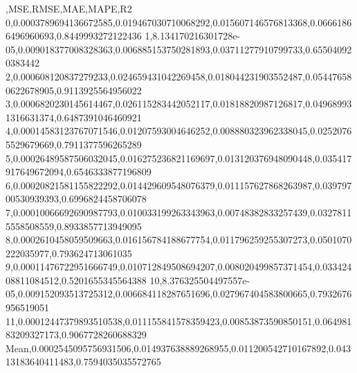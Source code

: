 ,MSE,RMSE,MAE,MAPE,R2
0,0.0003789694136672585,0.019467030710068292,0.015607146576813368,0.06661866496960693,0.8449993272122436
1,8.134170216301728e-05,0.009018377008328363,0.006885153750281893,0.03711277910799733,0.655040920383442
2,0.000608120837279233,0.024659431042269458,0.018044231903552487,0.054476580622678905,0.9113925564956022
3,0.0006820230145614467,0.026115283442052117,0.01818820987126817,0.049689931316631374,0.6487391046460921
4,0.00014583123767071546,0.01207593004646252,0.008880323962338045,0.02520765529679669,0.7911377596265289
5,0.00026489587506032045,0.016275236821169697,0.013120376948090448,0.035417917649672094,0.6546333877196809
6,0.00020821581155822292,0.014429609548076379,0.011157627868263987,0.03979700530939393,0.6996824458706078
7,0.00010066692690987793,0.010033199263343963,0.00748382833257439,0.03278115558508559,0.8933857713949095
8,0.0002610458059509663,0.016156784188677754,0.011796259255307273,0.0501070222035977,0.793624713061035
9,0.00011476722951666749,0.010712849508694207,0.008020499857371454,0.03342408811084512,0.5201655345564388
10,8.376325504497557e-05,0.009152093513725312,0.006684118287651696,0.027967404583800665,0.7932676956519051
11,0.00012447379893510538,0.011155841578359423,0.00853873590850151,0.06498183209327173,0.9067728260688329
Mean,0.0002545095756931506,0.014937638889268955,0.011200542710167892,0.04313183640411483,0.7594035035572765
